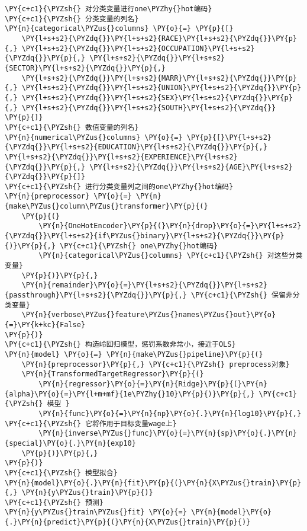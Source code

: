 \begin{Verbatim}[commandchars=\\\{\}]
\PY{c+c1}{\PYZsh{} 对分类变量进行one\PYZhy{}hot编码}
\PY{c+c1}{\PYZsh{} 分类变量的列名}
\PY{n}{categorical\PYZus{}columns} \PY{o}{=} \PY{p}{[}
    \PY{l+s+s2}{\PYZdq{}}\PY{l+s+s2}{RACE}\PY{l+s+s2}{\PYZdq{}}\PY{p}{,} \PY{l+s+s2}{\PYZdq{}}\PY{l+s+s2}{OCCUPATION}\PY{l+s+s2}{\PYZdq{}}\PY{p}{,} \PY{l+s+s2}{\PYZdq{}}\PY{l+s+s2}{SECTOR}\PY{l+s+s2}{\PYZdq{}}\PY{p}{,} 
    \PY{l+s+s2}{\PYZdq{}}\PY{l+s+s2}{MARR}\PY{l+s+s2}{\PYZdq{}}\PY{p}{,} \PY{l+s+s2}{\PYZdq{}}\PY{l+s+s2}{UNION}\PY{l+s+s2}{\PYZdq{}}\PY{p}{,} \PY{l+s+s2}{\PYZdq{}}\PY{l+s+s2}{SEX}\PY{l+s+s2}{\PYZdq{}}\PY{p}{,} \PY{l+s+s2}{\PYZdq{}}\PY{l+s+s2}{SOUTH}\PY{l+s+s2}{\PYZdq{}}
\PY{p}{]}
\PY{c+c1}{\PYZsh{} 数值变量的列名}
\PY{n}{numerical\PYZus{}columns} \PY{o}{=} \PY{p}{[}\PY{l+s+s2}{\PYZdq{}}\PY{l+s+s2}{EDUCATION}\PY{l+s+s2}{\PYZdq{}}\PY{p}{,} \PY{l+s+s2}{\PYZdq{}}\PY{l+s+s2}{EXPERIENCE}\PY{l+s+s2}{\PYZdq{}}\PY{p}{,} \PY{l+s+s2}{\PYZdq{}}\PY{l+s+s2}{AGE}\PY{l+s+s2}{\PYZdq{}}\PY{p}{]}
\PY{c+c1}{\PYZsh{} 进行分类变量列之间的one\PYZhy{}hot编码}
\PY{n}{preprocessor} \PY{o}{=} \PY{n}{make\PYZus{}column\PYZus{}transformer}\PY{p}{(}
    \PY{p}{(}
        \PY{n}{OneHotEncoder}\PY{p}{(}\PY{n}{drop}\PY{o}{=}\PY{l+s+s2}{\PYZdq{}}\PY{l+s+s2}{if\PYZus{}binary}\PY{l+s+s2}{\PYZdq{}}\PY{p}{)}\PY{p}{,} \PY{c+c1}{\PYZsh{} one\PYZhy{}hot编码}
        \PY{n}{categorical\PYZus{}columns} \PY{c+c1}{\PYZsh{} 对这些分类变量}
    \PY{p}{)}\PY{p}{,}
    \PY{n}{remainder}\PY{o}{=}\PY{l+s+s2}{\PYZdq{}}\PY{l+s+s2}{passthrough}\PY{l+s+s2}{\PYZdq{}}\PY{p}{,} \PY{c+c1}{\PYZsh{} 保留非分类变量}
    \PY{n}{verbose\PYZus{}feature\PYZus{}names\PYZus{}out}\PY{o}{=}\PY{k+kc}{False}
\PY{p}{)}
\PY{c+c1}{\PYZsh{} 构造岭回归模型，惩罚系数非常小，接近于OLS}
\PY{n}{model} \PY{o}{=} \PY{n}{make\PYZus{}pipeline}\PY{p}{(}
    \PY{n}{preprocessor}\PY{p}{,} \PY{c+c1}{\PYZsh{} preprocess对象}
    \PY{n}{TransformedTargetRegressor}\PY{p}{(}
        \PY{n}{regressor}\PY{o}{=}\PY{n}{Ridge}\PY{p}{(}\PY{n}{alpha}\PY{o}{=}\PY{l+m+mf}{1e\PYZhy{}10}\PY{p}{)}\PY{p}{,} \PY{c+c1}{\PYZsh{} 模型 }
        \PY{n}{func}\PY{o}{=}\PY{n}{np}\PY{o}{.}\PY{n}{log10}\PY{p}{,} \PY{c+c1}{\PYZsh{} 它将作用于目标变量wage上}
        \PY{n}{inverse\PYZus{}func}\PY{o}{=}\PY{n}{sp}\PY{o}{.}\PY{n}{special}\PY{o}{.}\PY{n}{exp10}
    \PY{p}{)}\PY{p}{,}
\PY{p}{)}
\PY{c+c1}{\PYZsh{} 模型拟合}
\PY{n}{model}\PY{o}{.}\PY{n}{fit}\PY{p}{(}\PY{n}{X\PYZus{}train}\PY{p}{,} \PY{n}{y\PYZus{}train}\PY{p}{)}
\PY{c+c1}{\PYZsh{} 预测}
\PY{n}{y\PYZus{}train\PYZus{}fit} \PY{o}{=} \PY{n}{model}\PY{o}{.}\PY{n}{predict}\PY{p}{(}\PY{n}{X\PYZus{}train}\PY{p}{)}

\end{Verbatim}
